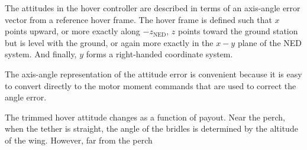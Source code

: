 \documentclass[11pt]{amsart}
\begin{document}
\begin{center}
\begin{figure}[h]
\end{figure}
\end{center}

The attitudes in the hover controller are described in terms of an
axis-angle error vector from a reference hover frame.  The hover frame
is defined such that $x$ points upward, or more exactly along
$-z_{\mathrm{NED}}$, $z$ points toward the ground station but is level
with the ground, or again more exactly in the $x-y$ plane of the NED
system.  And finally, $y$ forms a right-handed coordinate system.

The axis-angle representation of the attitude error is convenient
because it is easy to convert directly to the motor moment commands
that are used to correct the angle error.

The trimmed hover attitude changes as a function of payout.  Near the
perch, when the tether is straight, the angle of the bridles is
determined by the altitude of the wing.  However, far from the perch 
\end{document}
